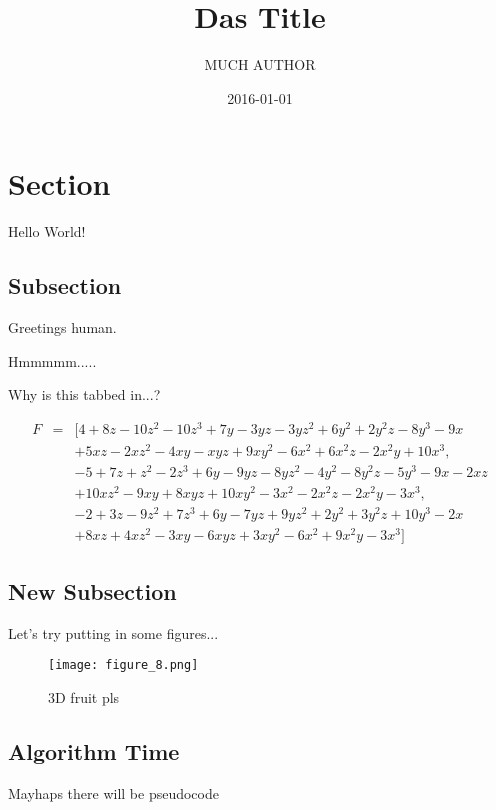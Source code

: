 \documentclass{article}
\title{Das Title}
\date{2016-01-01}
\author{MUCH AUTHOR}
\begin{document}
\maketitle
{}
\newpage
{}

\section{Section}

Hello World!

\subsection{Subsection}

Greetings human.

Hmmmmm.....

Why is this tabbed in...?

\begin{eqnarray*}
	F &=& [4+8z-10z^2-10z^3+7y-3yz-3yz^2+6y^2+2y^2z-8y^3-9x\\
     & & + 5xz-2xz^2-4xy-xyz+9xy^2-6x^2+6x^2z-2x^2y+10x^3,\\
     & & - 5+7z+z^2-2z^3+6y-9yz-8yz^2-4y^2-8y^2z-5y^3-9x-2xz\\
     & & + 10xz^2-9xy+8xyz+10xy^2-3x^2-2x^2z-2x^2y-3x^3,\\
     & & - 2+3z-9z^2+7z^3+6y-7yz+9yz^2+2y^2+3y^2z+10y^3-2x\\
     & & + 8xz+4xz^2-3xy-6xyz+3xy^2-6x^2+9x^2y-3x^3]
\end{eqnarray*}

\subsection{New Subsection}

Let's try putting in some figures...

\begin{figure}[ht!]
\centering
\texttt{[image: figure\_8.png]}
\caption{3D fruit pls \label{fig:3d fruit}}
\end{figure}

\subsection{Algorithm Time}
Mayhaps there will be pseudocode
\end{document}
